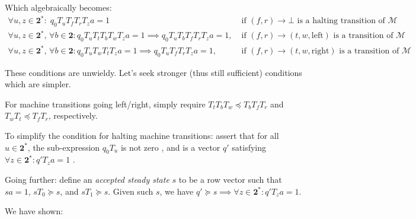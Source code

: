 Which algebraically becomes:
\begin{align*}
  \forall u,z\in\mathbf{2}^*: \; q_0 T_u T_f T_r T_z a = 1 \;& \text{if $(f,r) \to \bot$ is a halting transition of $\mathcal{M}$}
  \\
  \forall u,z\in\mathbf{2}^*,\,\forall b \in \mathbf{2}: q_0 T_{u} T_t T_b T_w T_{z} a = 1 \implies q_0 T_{u} T_b T_f T_r T_{z} a = 1,\;& \text{if $(f,r) \to (t,w,\text{left})$ is a transition of $\mathcal{M}$}
  \\
  \forall u,z\in\mathbf{2}^*,\,\forall b \in \mathbf{2}: q_0 T_{u} T_w T_t T_{z} a = 1 \implies q_0 T_{u} T_f T_r T_{z} a = 1,\;& \text{if $(f,r) \to (t,w,\text{right})$ is a transition of $\mathcal{M}$}
\end{align*}

These conditions are unwieldy. Let's seek stronger (thus still sufficient) conditions which are simpler.

For machine transitions going left/right, simply require $T_t T_b T_w\preceq T_b T_f T_r$ and $T_w T_t\preceq T_f T_r$, respectively.

To simplify the condition for halting machine transitions:
assert that for all $u \in \mathbf{2}^*$, the sub-expression $q_0 T_{u}$ is not zero ,
and 
is a vector $q'$ satisfying $\forall z\in\mathbf{2}^*: q' T_{z} a = 1$ .

Going further: define an \emph{accepted steady state} $s$ to be a row vector such that $sa = 1$, $s T_0\succeq s$, and $s T_1\succeq s$.
Given such $s$, we have $q'\succeq s\implies \forall z\in\mathbf{2}^*: q'T_{z}a = 1$.

We have shown:

